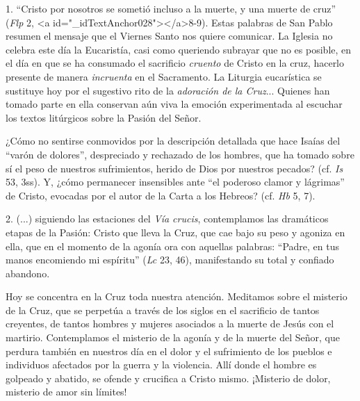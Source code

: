 			\begin{body}1. “Cristo por nosotros se sometió incluso a la muerte, y una muerte de cruz” (\textit{Flp} 2, <a id="_idTextAnchor028"></a>8-9). Estas palabras de San Pablo resumen el mensaje que el Viernes Santo nos quiere comunicar. La Iglesia no celebra este día la Eucaristía, casi como queriendo subrayar que no es posible, en el día en que se ha consumado el sacrificio \textit{cruento} de Cristo en la cruz, hacerlo presente de manera \textit{incruenta} en el Sacramento. La Liturgia eucarística se sustituye hoy por el sugestivo rito de la \textit{adoración de la Cruz}... Quienes han tomado parte en ella conservan aún viva la emoción experimentada al escuchar los textos litúrgicos sobre la Pasión del Señor.\end{body}
			
			\begin{body}¿Cómo no sentirse conmovidos por la descripción detallada que hace Isaías del “varón de dolores”, despreciado y rechazado de los hombres, que ha tomado sobre sí el peso de nuestros sufrimientos, herido de Dios por nuestros pecados? (cf. \textit{Is} 53, 3ss). Y, ¿cómo permanecer insensibles ante “el poderoso clamor y lágrimas” de Cristo, evocadas por el autor de la Carta a los Hebreos? (cf. \textit{Hb} 5, 7).\end{body}
			
			\begin{body}2. (...) siguiendo las estaciones del \textit{Vía crucis}, contemplamos las dramáticos etapas de la Pasión: Cristo que lleva la Cruz, que cae bajo su peso y agoniza en ella, que en el momento de la agonía ora con aquellas palabras: “Padre, en tus manos encomiendo mi espíritu” (\textit{Lc} 23, 46), manifestando su total y confiado abandono.\end{body}
			
			\begin{body}Hoy se concentra en la Cruz toda nuestra atención. Meditamos sobre el misterio de la Cruz, que se perpetúa a través de los siglos en el sacrificio de tantos creyentes, de tantos hombres y mujeres asociados a la muerte de Jesús con el martirio. Contemplamos el misterio de la agonía y de la muerte del Señor, que perdura también en nuestros día en el dolor y el sufrimiento de los pueblos e individuos afectados por la guerra y la violencia. Allí donde el hombre es golpeado y abatido, se ofende y crucifica a Cristo mismo. ¡Misterio de dolor, misterio de amor sin límites! \end{body}
			
